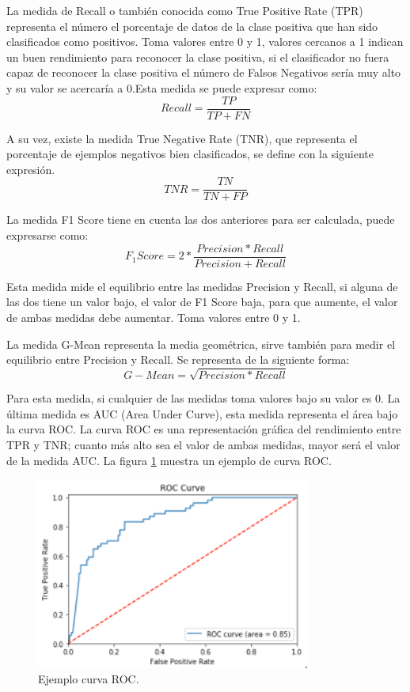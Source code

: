 La medida de Recall o también conocida como True Positive Rate (TPR) representa el número el porcentaje de datos de la clase positiva que han sido clasificados como positivos. Toma valores entre 0 y 1, valores cercanos a 1 indican un buen rendimiento para reconocer la clase positiva, si el clasificador no fuera capaz de reconocer la clase positiva el número de Falsos Negativos sería muy alto y su valor se acercaría a 0.Esta medida se puede expresar como:\newline
$$ Recall = \frac{TP}{TP + FN} $$


A su vez, existe la medida True Negative Rate (TNR), que representa el porcentaje de ejemplos negativos bien clasificados, se define con la siguiente expresión.\newline
$$ TNR = \frac{TN}{TN + FP} $$

La medida F1 Score tiene en cuenta las dos anteriores para ser calculada, puede expresarse como:\newline
$$ F_1 Score = 2 * \frac{Precision*Recall}{Precision+Recall} $$

Esta medida mide el equilibrio entre las medidas Precision y Recall, si alguna de las dos tiene un valor bajo, el valor de F1 Score baja, para que aumente, el valor de ambas medidas debe aumentar. Toma valores entre 0 y 1.\newline

La medida G-Mean representa la media geométrica, sirve también para medir el equilibrio entre Precision y Recall. Se representa de la siguiente forma:\newline
$$ G-Mean = \sqrt{Precision*Recall} $$

Para esta medida, si cualquier de las medidas toma valores bajo su valor es 0.\newline
La última medida es AUC (Area Under Curve), esta medida representa el área bajo la curva ROC. La curva ROC es una representación gráfica del rendimiento entre TPR y TNR; cuanto más alto sea el valor de ambas medidas, mayor será el valor de la medida AUC. La figura \ref{fig:62} muestra un ejemplo de curva ROC.\newline

\begin{figure}[H]
	\centering
	\includegraphics[width=90mm]{imagenes/auc.png}
	\caption{Ejemplo curva ROC.}
	\label{fig:62}
\end{figure}
\verticalspace

